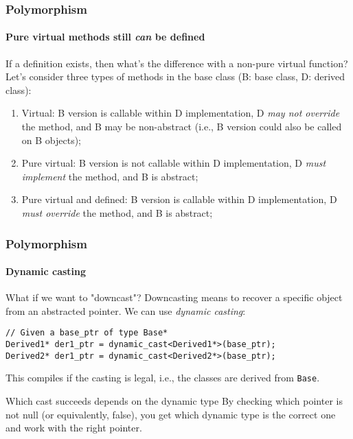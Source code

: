 \begin{frame}[fragile]
\frametitle{Polymorphism}
\framesubtitle{Pure virtual methods still {\em can} be defined}

\begin{block}{If a definition exists, then what's the difference with a non-pure virtual function?}
Let's consider three types of methods in the base class (B: base class, D: derived class):
\begin{enumerate}
\item Virtual: B version is callable within D implementation, D {\em may not override} the method, and B may be non-abstract (i.e., B version could also be called on B objects);
\pause
\item Pure virtual: B version is not callable within D implementation, D {\em must implement} the method, and B is abstract;
\pause
\item Pure virtual and defined: B version is callable within D implementation, D {\em must override} the method, and B is abstract;
\end{enumerate}
\end{block}

\end{frame}

\begin{frame}[fragile]
\frametitle{Polymorphism}
\framesubtitle{Dynamic casting}

\begin{block}{What if we want to "downcast"?}
Downcasting means to recover a specific object from an abstracted pointer.
We can use {\em dynamic casting}:

{\scriptsize 
\begin{verbatim}
// Given a base_ptr of type Base*
Derived1* der1_ptr = dynamic_cast<Derived1*>(base_ptr);
Derived2* der1_ptr = dynamic_cast<Derived2*>(base_ptr);
\end{verbatim}
}
This compiles if the casting is legal, i.e., the classes are derived from \texttt{Base}.
\end{block}
\begin{block}{Which cast succeeds depends on the dynamic type}
By checking which pointer is not null (or equivalently, false), you get which dynamic type is the correct one and work with the right pointer.
\end{block}

\end{frame}

